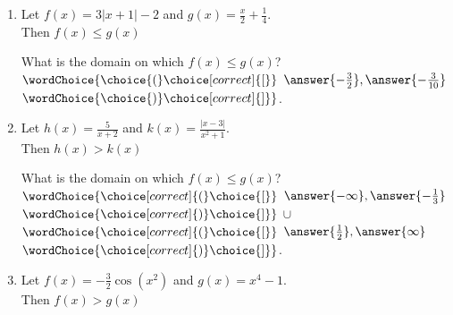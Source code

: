 \documentclass{ximera}
\author{Elizabeth Campolongo}
\begin{document}
\begin{exercise}
%
\begin{enumerate}

\item Let $f(x) = 3|x+1|-2$ and $g(x) = \frac{x}{2} + \frac{1}{4}$. \\
Then $f(x) \leq g(x)$ 
\begin{multipleChoice}
\end{multipleChoice}
\begin{exercise}
What is the domain on which $f(x) \leq g(x)$?\\
$\wordChoice{\choice{(}\choice[correct]{[}}$ $\answer{-\frac{3}{2}} , \answer{-\frac{3}{10}}$ 
$\wordChoice{\choice{)}\choice[correct]{]}}$.
\end{exercise}

\item Let $h(x) = \frac{5}{x+2}$ and $k(x) = \frac{|x-3|}{x^2+1}$.\\
Then $h(x) > k(x)$ 
\begin{multipleChoice}
\end{multipleChoice}
\begin{exercise}
What is the domain on which $f(x) \leq g(x)$?\\
$\wordChoice{\choice[correct]{(}\choice{[}}$ $\answer{-\infty} , \answer{-\frac{1}{3}}$ 
$\wordChoice{\choice[correct]{)}\choice{]}}$
$\cup$
$\wordChoice{\choice[correct]{(}\choice{[}}$ $\answer{\frac{1}{2}} , \answer{\infty}$ 
$\wordChoice{\choice[correct]{)}\choice{]}}$.
\end{exercise}

\item Let $f(x) = -\frac{3}{2}\cos(x^2)$ and $g(x) = x^4-1$. \\
Then $f(x) > g(x)$ 
\begin{multipleChoice}
\end{multipleChoice}


\end{enumerate}
\end{exercise}
\end{document}
